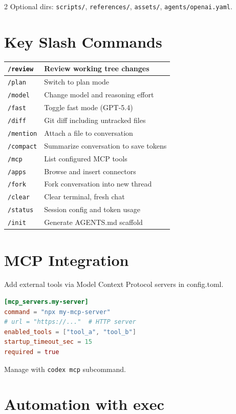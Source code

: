 \documentclass[a4paper, 9pt]{scrartcl}
\makeatletter
\newcommand{\cmdtable}[1]{%
  \smallskip
  \begin{tabularx}{\columnwidth}{@{}lX@{}}
  \toprule
  #1
  \bottomrule
  \end{tabularx}
  \smallskip
}
\makeatother
\begin{document}
\begin{multicols}{2}
Optional dirs: \texttt{scripts/}, \texttt{references/}, \texttt{assets/}, \texttt{agents/openai.yaml}.

\section{Key Slash Commands}

\cmdtable{
\texttt{/review} & Review working tree changes \\
\midrule
\texttt{/plan} & Switch to plan mode \\
\midrule
\texttt{/model} & Change model and reasoning effort \\
\midrule
\texttt{/fast} & Toggle fast mode (GPT-5.4) \\
\midrule
\texttt{/diff} & Git diff including untracked files \\
\midrule
\texttt{/mention} & Attach a file to conversation \\
\midrule
\texttt{/compact} & Summarize conversation to save tokens \\
\midrule
\texttt{/mcp} & List configured MCP tools \\
\midrule
\texttt{/apps} & Browse and insert connectors \\
\midrule
\texttt{/fork} & Fork conversation into new thread \\
\midrule
\texttt{/clear} & Clear terminal, fresh chat \\
\midrule
\texttt{/status} & Session config and token usage \\
\midrule
\texttt{/init} & Generate AGENTS.md scaffold \\
}

\section{MCP Integration}

Add external tools via Model Context Protocol servers in config.toml.

\begin{lstlisting}[language=toml]
[mcp_servers.my-server]
command = "npx my-mcp-server"
# url = "https://..."  # HTTP server
enabled_tools = ["tool_a", "tool_b"]
startup_timeout_sec = 15
required = true
\end{lstlisting}

Manage with \texttt{codex mcp} subcommand.

\section{Automation with exec}


\end{multicols}
\end{document}
